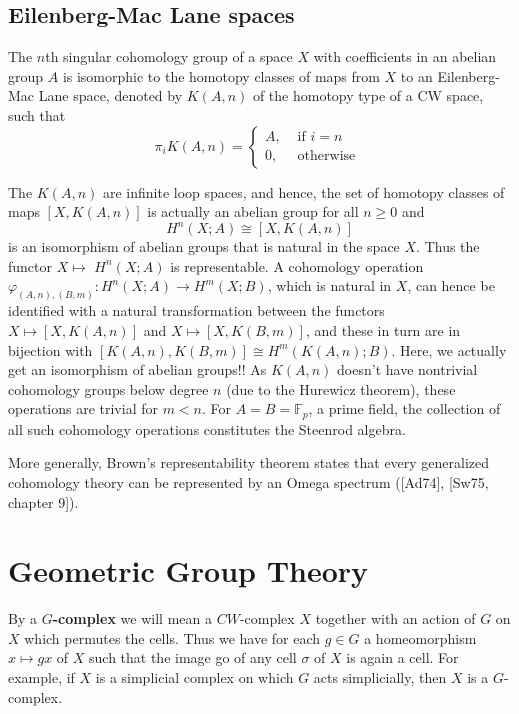 \section{Eilenberg-Mac Lane spaces}

The $n$th singular cohomology group of a space $X$ with coefficients in an abelian group $A$ is isomorphic to the homotopy classes of maps from $X$ to an Eilenberg-Mac Lane space, denoted by $K(A, n)$ of the homotopy type of a CW space, such that
$$
\pi_i K(A, n)= \begin{cases}A, & \text { if } i=n \\ 0, & \text { otherwise }\end{cases}
$$

The $K(A, n)$ are infinite loop spaces, and hence, the set of homotopy classes of maps $[X, K(A, n)]$ is actually an abelian group for all $n \geq 0$ and
$$
H^n(X ; A) \cong[X, K(A, n)]
$$
is an isomorphism of abelian groups that is natural in the space $X$. Thus the functor $X \mapsto$ $H^n(X ; A)$ is representable. A cohomology operation $\varphi_{(A, n),(B, m)}: H^n(X ; A) \rightarrow H^m(X ; B)$, which is natural in $X$, can hence be identified with a natural transformation between the functors $X \mapsto[X, K(A, n)]$ and $X \mapsto[X, K(B, m)]$, and these in turn are in bijection with $[K(A, n), K(B, m)] \cong H^m(K(A, n) ; B)$. Here, we actually get an isomorphism of abelian groups!! As $K(A, n)$ doesn't have nontrivial cohomology groups below degree $n$ (due to the Hurewicz theorem), these operations are trivial for $m<n$. For $A=B=\mathbb{F}_p$, a prime field, the collection of all such cohomology operations constitutes the Steenrod algebra.

More generally, Brown's representability theorem states that every generalized cohomology theory can be represented by an Omega spectrum ([Ad74], [Sw75, chapter 9]).






\chapter{Geometric Group Theory}

By a \textbf{$G$-complex} we will mean a $C W$-complex $X$ together with an action of $G$ on $X$ which permutes the cells. Thus we have for each $g \in G$ a homeomorphism $x \mapsto g x$ of $X$ such that the image go of any cell $\sigma$ of $X$ is again a cell. For example, if $X$ is a simplicial complex on which $G$ acts simplicially, then $X$ is a $G$-complex.

